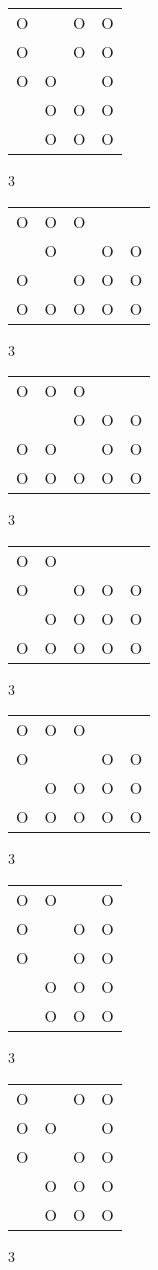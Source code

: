 \begin{tabular}{|m{0.2cm}m{0.2cm}m{0.2cm}m{0.2cm}|}\hline
O& &O&O\\
O& &O&O\\
O&O& &O\\
 &O&O&O\\
 &O&O&O\\
\hline\end{tabular}3
\begin{tabular}{|m{0.2cm}m{0.2cm}m{0.2cm}m{0.2cm}m{0.2cm}|}\hline
O&O&O& & \\
 &O& &O&O\\
O& &O&O&O\\
O&O&O&O&O\\
\hline\end{tabular}3
\begin{tabular}{|m{0.2cm}m{0.2cm}m{0.2cm}m{0.2cm}m{0.2cm}|}\hline
O&O&O& & \\
 & &O&O&O\\
O&O& &O&O\\
O&O&O&O&O\\
\hline\end{tabular}3
\begin{tabular}{|m{0.2cm}m{0.2cm}m{0.2cm}m{0.2cm}m{0.2cm}|}\hline
O&O& & & \\
O& &O&O&O\\
 &O&O&O&O\\
O&O&O&O&O\\
\hline\end{tabular}3
\begin{tabular}{|m{0.2cm}m{0.2cm}m{0.2cm}m{0.2cm}m{0.2cm}|}\hline
O&O&O& & \\
O& & &O&O\\
 &O&O&O&O\\
O&O&O&O&O\\
\hline\end{tabular}3
\begin{tabular}{|m{0.2cm}m{0.2cm}m{0.2cm}m{0.2cm}|}\hline
O&O& &O\\
O& &O&O\\
O& &O&O\\
 &O&O&O\\
 &O&O&O\\
\hline\end{tabular}3
\begin{tabular}{|m{0.2cm}m{0.2cm}m{0.2cm}m{0.2cm}|}\hline
O& &O&O\\
O&O& &O\\
O& &O&O\\
 &O&O&O\\
 &O&O&O\\
\hline\end{tabular}3
